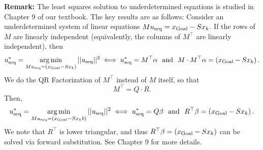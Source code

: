 \textbf{Remark:} The least squares solution to underdetermined equations is studied in Chapter 9 of our textbook. The key results are as follows: Consider an underdetermined system of linear equations $M u_{\rm seq}=x_{\rm Goal}-S x_k$. If the rows of $M$ are linearly independent (equivalently, the columns of $M^\top$ are linearly independent), then 
\begin{equation}
\label{eq:MinNormUnderDetermined}
    u_{\rm seq}^\ast = \operatorname*{arg\,min}_{M u_{\rm seq}=(x_{\rm Goal}-S x_k)} ||u_{\rm seq}||^2  \iff u_{\rm seq}^\ast= M^\top \alpha~~\text{and}~~M\cdot M^\top \alpha = \left(x_{\rm Goal}-S x_k\right).
\end{equation}
We do the QR Factorization of $M^\top$ instead of $M$ itself, so that
$$ M^\top = Q \cdot R.$$
Then, 
\begin{equation}
\label{eq:MinNormUnderDeterminedQR}
    u_{\rm seq}^\ast = \operatorname*{arg\,min}_{M u_{\rm seq}=(x_{\rm Goal}-S x_kb)} ||u_{\rm seq}||^2  \iff u_{\rm seq}^\ast = Q \beta~~\text{and}~~R^\top \beta = \left(x_{\rm Goal}-S x_k \right).
\end{equation}
We note that $R^\top$ is lower triangular, and thus $R^\top \beta = \left(x_{\rm Goal}-S x_k \right)$ can be solved via forward substitution. See Chapter 9 for more details. 
\newpage

